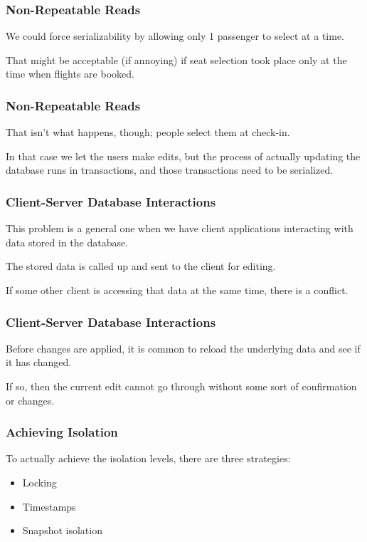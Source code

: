 \begin{frame}
\frametitle{Non-Repeatable Reads}

We could force serializability by allowing only 1 passenger to select at a time. 

That might be acceptable (if annoying) if seat selection took place only at the time when flights are booked. 


\end{frame}

\begin{frame}
\frametitle{Non-Repeatable Reads}


That isn't what happens, though; people select them at check-in. 

In that case we let the users make edits, but the process of actually updating the database runs in transactions, and those transactions need to be serialized. 

\end{frame}

\begin{frame}
\frametitle{Client-Server Database Interactions}

This problem is a general one when we have client applications interacting with data stored in the database. 

The stored data is called up and sent to the client for editing. 

If some other client is accessing that data at the same time, there is a conflict. 

\end{frame}

\begin{frame}
\frametitle{Client-Server Database Interactions}


Before changes are applied, it is common to reload the underlying data and see if it has changed. 

If so, then the current edit cannot go through without some sort of confirmation or changes.

\end{frame}

\begin{frame}
\frametitle{Achieving Isolation}

To actually achieve the isolation levels, there are three strategies: 

\begin{itemize}
\item Locking 
\item Timestamps 
\item Snapshot isolation
\end{itemize}

\end{frame}

